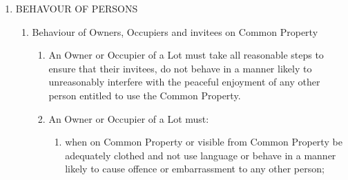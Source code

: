 \documentclass{article}
\begin{document}
\begin{enumerate}[label=\arabic*.]
\begin{enumerate}[label=\arabic{enumi}.\arabic*.]
\begin{enumerate}[label=\arabic{enumi}.\arabic*.]
\begin{enumerate}[label=(\arabic*)]
\item  An Owner or Occupier of the Lot must indemnify the Owners Corporation against any damage, expense, loss or liability incurred by the Owners Corporation and if the Owners Corporation makes good any damage to, or cleans the Common Property or undertakes cleaning required as a result of the building works, the Lot Owner or Occupier will reimburse the Owners Corporation for any cost or liability incurred.

\end{enumerate}

\item  The Lot Owner must pay Owners Corporation costs

\begin{enumerate}[label=(\arabic*)]

\item  If the Owners Corporation requires advice from an architect or other consultant concerning the proposed building works, the Lot Owner must pay on demand the reasonable fees and expenses which the Owners Corporation incurs for seeking that advice.

\end{enumerate}

\end{enumerate}

\item  BEHAVOUR OF PERSONS

\begin{enumerate}[label=\arabic{enumi}.\arabic*.]

\item  Behaviour of Owners, Occupiers and invitees on Common Property

\begin{enumerate}[label=(\arabic*)]

\item  An Owner or Occupier of a Lot must take all reasonable steps to ensure that their invitees, do not behave in a manner likely to unreasonably interfere with the peaceful enjoyment of any other person entitled to use the Common Property.

\item  An Owner or Occupier of a Lot must:

\begin{enumerate}[label=(\alph*)]

\item  when on Common Property or visible from Common Property be adequately clothed and not use language or behave in a manner likely to cause offence or embarrassment to any other person;
\newpage




\end{enumerate}
\end{enumerate}
\end{enumerate}
\end{enumerate}
\end{enumerate}
\end{document}
